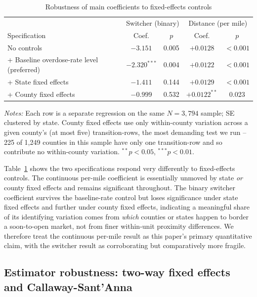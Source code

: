 \documentclass[11pt]{article}
\begin{document}
\begin{table}[htbp]
\centering
\caption{Robustness of main coefficients to fixed-effects controls}
\label{tab:fe}
\begin{tabular}{@{}lcccc@{}}
\toprule
 & \multicolumn{2}{c}{Switcher (binary)} & \multicolumn{2}{c}{Distance (per mile)} \\
Specification & Coef. & $p$ & Coef. & $p$ \\
\midrule
No controls & $-3.151$ & 0.005 & $+0.0128$ & $<0.001$ \\
+ Baseline overdose-rate level (preferred) & $-2.320^{***}$ & 0.004 & $+0.0122$ & $<0.001$ \\
+ State fixed effects & $-1.411$ & 0.144 & $+0.0129$ & $<0.001$ \\
+ County fixed effects & $-0.999$ & 0.532 & $+0.0122^{**}$ & 0.023 \\
\bottomrule
\end{tabular}
\vspace{2pt}
\begin{minipage}{0.92\textwidth}
\footnotesize\emph{Notes:} Each row is a separate regression on the
same $N=3{,}794$ sample; SE clustered by state. County fixed effects
use only within-county variation across a given county's (at most
five) transition-rows, the most demanding test we run -- 225 of 1,249
counties in this sample have only one transition-row and so contribute
no within-county variation. $^{**}p<0.05$, $^{***}p<0.01$.
\end{minipage}
\end{table}

Table~\ref{tab:fe} shows the two specifications respond very
differently to fixed-effects controls. The continuous per-mile
coefficient is essentially unmoved by state \emph{or} county fixed
effects and remains significant throughout. The binary switcher
coefficient survives the baseline-rate control but loses significance
under state fixed effects and further under county fixed effects,
indicating a meaningful share of its identifying variation comes from
\emph{which} counties or states happen to border a soon-to-open
market, not from finer within-unit proximity differences. We therefore
treat the continuous per-mile result as this paper's primary
quantitative claim, with the switcher result as corroborating but
comparatively more fragile.

\subsection{Estimator robustness: two-way fixed effects and Callaway-Sant'Anna}
\label{sec:twfecs}
\end{document}
